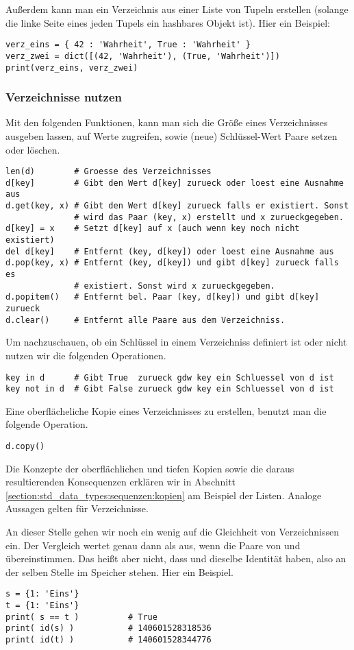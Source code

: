 Außerdem kann man ein Verzeichnis aus einer Liste von Tupeln erstellen (solange die linke Seite eines jeden Tupels ein hashbares Objekt ist).
Hier ein Beispiel:
\begin{lstlisting}
verz_eins = { 42 : 'Wahrheit', True : 'Wahrheit' }
verz_zwei = dict([(42, 'Wahrheit'), (True, 'Wahrheit')])
print(verz_eins, verz_zwei)
\end{lstlisting}


\subsubsection{Verzeichnisse nutzen}
\label{section:std_data_types:verzeichnisse:verzeichnisse_nutzen}
Mit den folgenden Funktionen, kann man sich die Größe eines Verzeichnisses  ausgeben lassen,
auf Werte zugreifen, sowie (neue) Schlüssel-Wert Paare setzen oder löschen.
\begin{lstlisting}
len(d)        # Groesse des Verzeichnisses
d[key]        # Gibt den Wert d[key] zurueck oder loest eine Ausnahme aus
d.get(key, x) # Gibt den Wert d[key] zurueck falls er existiert. Sonst
              # wird das Paar (key, x) erstellt und x zurueckgegeben.
d[key] = x    # Setzt d[key] auf x (auch wenn key noch nicht existiert)
del d[key]    # Entfernt (key, d[key]) oder loest eine Ausnahme aus
d.pop(key, x) # Entfernt (key, d[key]) und gibt d[key] zurueck falls es
              # existiert. Sonst wird x zurueckgegeben.
d.popitem()   # Entfernt bel. Paar (key, d[key]) und gibt d[key] zurueck
d.clear()     # Entfernt alle Paare aus dem Verzeichniss.
\end{lstlisting}
Um nachzuschauen, ob ein Schlüssel in einem Verzeichniss  definiert ist oder nicht nutzen wir die folgenden Operationen.
\begin{lstlisting}
key in d      # Gibt True  zurueck gdw key ein Schluessel von d ist
key not in d  # Gibt False zurueck gdw key ein Schluessel von d ist
\end{lstlisting}
Eine oberflächeliche Kopie eines Verzeichnisses  zu erstellen, benutzt man die folgende Operation.
\begin{lstlisting}
d.copy()
\end{lstlisting}
Die Konzepte der oberflächlichen und tiefen Kopien sowie die daraus resultierenden Konsequenzen erklären wir in Abschnitt \ref{section:std_data_types:sequenzen:kopien} am Beispiel der Listen.
Analoge Aussagen gelten für Verzeichnisse.

An dieser Stelle gehen wir noch ein wenig auf die Gleichheit von Verzeichnissen ein.
Der Vergleich  wertet genau dann als  aus, wenn die Paare von  und  übereinstimmen.
Das heißt aber nicht, dass  und  dieselbe Identität haben, also an der selben Stelle im Speicher stehen.
Hier ein Beispiel.
\begin{lstlisting}
s = {1: 'Eins'}
t = {1: 'Eins'}
print( s == t )          # True
print( id(s) )           # 140601528318536
print( id(t) )           # 140601528344776
\end{lstlisting}

